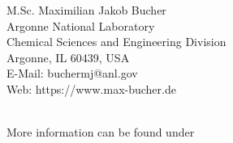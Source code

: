 \begin{flushleft}
{\Large M.Sc. Maximilian Jakob Bucher}\\
\footnotesize{Argonne National Laboratory\\
Chemical Sciences and Engineering Division\\
Argonne, IL 60439, USA\\
E-Mail: buchermj@anl.gov\\
Web: https://www.max-bucher.de}
\end{flushleft}
\vspace{14cm}
\doclicenseThis\\
More information can be found under\\ \doclicenseURL
